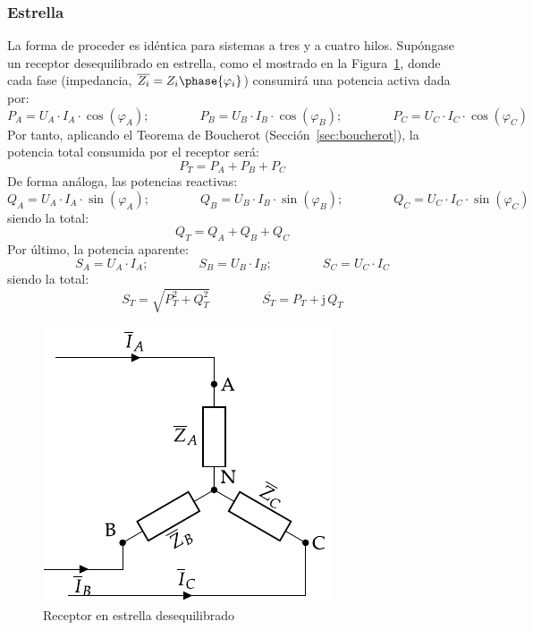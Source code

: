 	\subsubsection{Estrella}
	La forma de proceder es idéntica para sistemas a tres y a cuatro hilos. Supóngase un receptor desequilibrado en estrella, como el mostrado en la Figura~\ref{fig:estrellaDesequilibrado_potencia}, donde cada fase (impedancia, $\overline{Z_i}=Z_i\phase{\varphi_i}$) consumirá una potencia activa dada por: 
	\begin{equation*}
	    P_A=U_{A}\cdot I_A \cdot \cos(\varphi_A);\qquad \qquad
	    P_B=U_{B}\cdot I_B \cdot \cos(\varphi_B);\qquad \qquad
	    P_C=U_{C}\cdot I_C \cdot \cos(\varphi_C)
	\end{equation*}
	Por tanto, aplicando el Teorema de Boucherot (Sección~\ref{sec:boucherot}), la potencia total consumida por el receptor será:
	\begin{equation}
	    \boxed{P_T=P_A+P_B+P_C}
	\end{equation}
	De forma análoga, las potencias reactivas:
	\begin{equation*}
	    Q_A=U_{A}\cdot I_A \cdot \sin(\varphi_A);\qquad \qquad
	    Q_B=U_{B}\cdot I_B \cdot \sin(\varphi_B);\qquad \qquad
	    Q_C=U_{C}\cdot I_C \cdot \sin(\varphi_C)
	\end{equation*}
	siendo la total: 
	\begin{equation}
	    \boxed{Q_T=Q_A+Q_B+Q_C}
	\end{equation}
	Por último, la potencia aparente: 
	\begin{equation*}
	    S_A=U_{A}\cdot I_A;\qquad \qquad
	    S_B=U_{B}\cdot I_B;\qquad \qquad
	    S_C=U_{C}\cdot I_C
	\end{equation*}
	siendo la total: 
	\begin{equation}
	    \boxed{S_T=\sqrt{P_T^2+Q_T^2}}\,\qquad\qquad \boxed{\overline{S_T}=P_T+\mathrm{j}\,Q_T}
	\end{equation}
	
	\begin{figure}[H]
	    \centering
	    \includegraphics{../figs/EstrellaDesequilibrado_Receptor_SN.pdf}
	    \caption{Receptor en estrella desequilibrado}
	    \label{fig:estrellaDesequilibrado_potencia}
	\end{figure}
	
